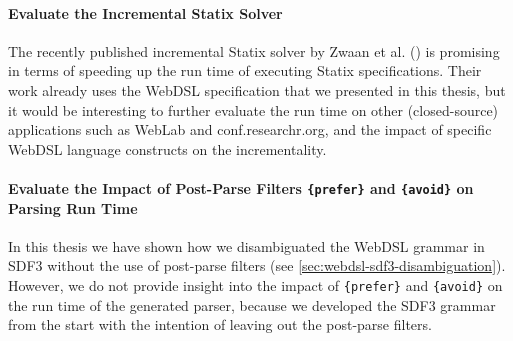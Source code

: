   \paragraph{Evaluate the Incremental Statix Solver} The recently published incremental Statix solver by Zwaan et al. (\citeyear{ZwaanAV22}) is promising in terms of speeding up the run time of executing Statix specifications. Their work already uses the WebDSL specification that we presented in this thesis, but it would be interesting to further evaluate the run time on other (closed-source) applications such as WebLab and conf.researchr.org, and the impact of specific WebDSL language constructs on the incrementality.

  \paragraph{Evaluate the Impact of Post-Parse Filters \texttt{\{prefer\}} and \texttt{\{avoid\}} on Parsing Run Time} In this thesis we have shown how we disambiguated the WebDSL grammar in SDF3 without the use of post-parse filters (see \cref{sec:webdsl-sdf3-disambiguation}). However, we do not provide insight into the impact of \texttt{\{prefer\}} and \texttt{\{avoid\}} on the run time of the generated parser, because we developed the SDF3 grammar from the start with the intention of leaving out the post-parse filters.

